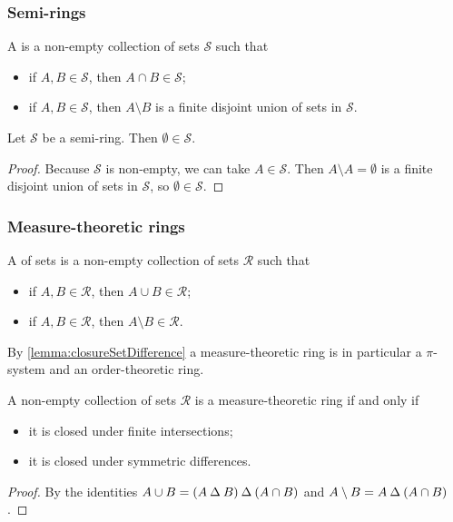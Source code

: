 \subsubsection{Semi-rings}
\begin{definition}
A  is a non-empty collection of sets $\mathcal{S}$ such that
\begin{itemize}
\item if $A,B\in \mathcal{S}$, then $A\cap B\in \mathcal{S}$;
\item if $A,B\in \mathcal{S}$, then $A\setminus B$ is a finite disjoint union of sets in $\mathcal{S}$.
\end{itemize}
\end{definition}

\begin{lemma}
Let $\mathcal{S}$ be a semi-ring. Then $\emptyset \in \mathcal{S}$.
\end{lemma}
\begin{proof}
Because $\mathcal{S}$ is non-empty, we can take $A\in \mathcal{S}$. Then $A\setminus A = \emptyset$ is a finite disjoint union of sets in $\mathcal{S}$, so $\emptyset \in \mathcal{S}$.
\end{proof}

\subsubsection{Measure-theoretic rings}
\begin{definition}
A  of sets is a non-empty collection of sets $\mathcal{R}$ such that
\begin{itemize}
\item if $A,B\in \mathcal{R}$, then $A\cup B\in \mathcal{R}$;
\item if $A,B\in \mathcal{R}$, then $A\setminus B\in \mathcal{R}$.
\end{itemize}
\end{definition}
By \ref{lemma:closureSetDifference} a measure-theoretic ring is in particular a $\pi$-system and an order-theoretic ring.

\begin{lemma}
A non-empty collection of sets $\mathcal{R}$ is a measure-theoretic ring \textup{if and only if}
\begin{itemize}
\item it is closed under finite intersections;
\item it is closed under symmetric differences.
\end{itemize}
\end{lemma}
\begin{proof}
By the identities $A\cup B = (A\mathbin{\Delta} B)\mathbin{\Delta} (A\cap B)$ and $A\setminus B = A\mathbin{\Delta} (A\cap B)$.
\end{proof}

